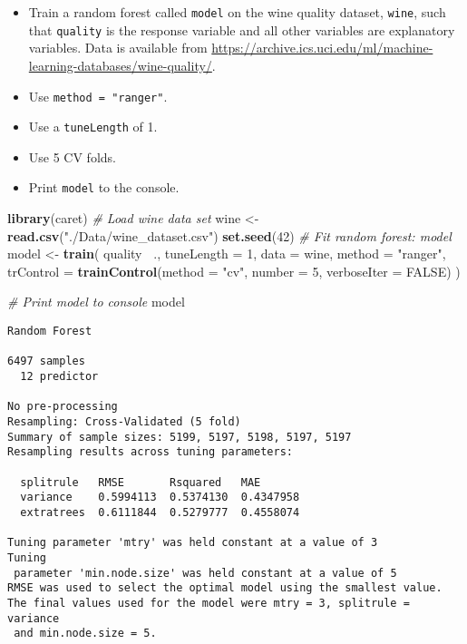 \documentclass[]{book}
\newenvironment{Shaded}{\begin{snugshade}}{\end{snugshade}}
\newcommand{\KeywordTok}[1]{\textcolor[rgb]{0.13,0.29,0.53}{\textbf{#1}}}
\newcommand{\DataTypeTok}[1]{\textcolor[rgb]{0.13,0.29,0.53}{#1}}
\newcommand{\DecValTok}[1]{\textcolor[rgb]{0.00,0.00,0.81}{#1}}
\newcommand{\StringTok}[1]{\textcolor[rgb]{0.31,0.60,0.02}{#1}}
\newcommand{\CommentTok}[1]{\textcolor[rgb]{0.56,0.35,0.01}{\textit{#1}}}
\newcommand{\OtherTok}[1]{\textcolor[rgb]{0.56,0.35,0.01}{#1}}
\newcommand{\OperatorTok}[1]{\textcolor[rgb]{0.81,0.36,0.00}{\textbf{#1}}}
\newcommand{\NormalTok}[1]{#1}
\begin{document}
\begin{itemize}
\item
  Train a random forest called \texttt{model} on the wine quality
  dataset, \texttt{wine}, such that \texttt{quality} is the response
  variable and all other variables are explanatory variables. Data is
  available from
  \url{https://archive.ics.uci.edu/ml/machine-learning-databases/wine-quality/}.
\item
  Use \texttt{method\ =\ "ranger"}.
\item
  Use a \texttt{tuneLength} of 1.
\item
  Use 5 CV folds.
\item
  Print \texttt{model} to the console.
\end{itemize}

\begin{Shaded}
\begin{Highlighting}[]
\KeywordTok{library}\NormalTok{(caret)}
\CommentTok{# Load wine data set}
\NormalTok{wine <-}\StringTok{ }\KeywordTok{read.csv}\NormalTok{(}\StringTok{"./Data/wine_dataset.csv"}\NormalTok{)}
\KeywordTok{set.seed}\NormalTok{(}\DecValTok{42}\NormalTok{)}
\CommentTok{# Fit random forest: model}
\NormalTok{model <-}\StringTok{ }\KeywordTok{train}\NormalTok{(}
\NormalTok{  quality }\OperatorTok{~}\NormalTok{.,}
  \DataTypeTok{tuneLength =} \DecValTok{1}\NormalTok{,}
  \DataTypeTok{data =}\NormalTok{ wine, }
  \DataTypeTok{method =} \StringTok{"ranger"}\NormalTok{,}
  \DataTypeTok{trControl =} \KeywordTok{trainControl}\NormalTok{(}\DataTypeTok{method =} \StringTok{"cv"}\NormalTok{, }
                           \DataTypeTok{number =} \DecValTok{5}\NormalTok{, }
                           \DataTypeTok{verboseIter =} \OtherTok{FALSE}\NormalTok{)}
\NormalTok{)}

\CommentTok{# Print model to console}
\NormalTok{model}
\end{Highlighting}
\end{Shaded}

\begin{verbatim}
Random Forest 

6497 samples
  12 predictor

No pre-processing
Resampling: Cross-Validated (5 fold) 
Summary of sample sizes: 5199, 5197, 5198, 5197, 5197 
Resampling results across tuning parameters:

  splitrule   RMSE       Rsquared   MAE      
  variance    0.5994113  0.5374130  0.4347958
  extratrees  0.6111844  0.5279777  0.4558074

Tuning parameter 'mtry' was held constant at a value of 3
Tuning
 parameter 'min.node.size' was held constant at a value of 5
RMSE was used to select the optimal model using the smallest value.
The final values used for the model were mtry = 3, splitrule = variance
 and min.node.size = 5.
\end{verbatim}
\end{document}
